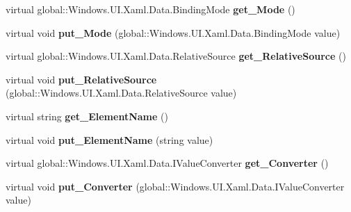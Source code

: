 \begin{DoxyCompactItemize}
virtual global\+::\+Windows.\+U\+I.\+Xaml.\+Data.\+Binding\+Mode {\bfseries get\+\_\+\+Mode} ()
\item 
\mbox{\label{class_windows_1_1_u_i_1_1_xaml_1_1_data_1_1_binding_abc7d75756c9f93a8ec488cecb97265c5}} 
virtual void {\bfseries put\+\_\+\+Mode} (global\+::\+Windows.\+U\+I.\+Xaml.\+Data.\+Binding\+Mode value)
\item 
\mbox{\label{class_windows_1_1_u_i_1_1_xaml_1_1_data_1_1_binding_ac23f4899bbf0de1eaba1d8fc24e9f7c3}} 
virtual global\+::\+Windows.\+U\+I.\+Xaml.\+Data.\+Relative\+Source {\bfseries get\+\_\+\+Relative\+Source} ()
\item 
\mbox{\label{class_windows_1_1_u_i_1_1_xaml_1_1_data_1_1_binding_a9e13fc7038d328684876c114c0262cd2}} 
virtual void {\bfseries put\+\_\+\+Relative\+Source} (global\+::\+Windows.\+U\+I.\+Xaml.\+Data.\+Relative\+Source value)
\item 
\mbox{\label{class_windows_1_1_u_i_1_1_xaml_1_1_data_1_1_binding_a93680aa9f018dd4f75ac7515c0a00ebf}} 
virtual string {\bfseries get\+\_\+\+Element\+Name} ()
\item 
\mbox{\label{class_windows_1_1_u_i_1_1_xaml_1_1_data_1_1_binding_aabd010dd96a55bf922196a78fe1ad2ed}} 
virtual void {\bfseries put\+\_\+\+Element\+Name} (string value)
\item 
\mbox{\label{class_windows_1_1_u_i_1_1_xaml_1_1_data_1_1_binding_a75056d5c72401518166caead820596d9}} 
virtual global\+::\+Windows.\+U\+I.\+Xaml.\+Data.\+I\+Value\+Converter {\bfseries get\+\_\+\+Converter} ()
\item 
\mbox{\label{class_windows_1_1_u_i_1_1_xaml_1_1_data_1_1_binding_a5721074cd9c3ec7e50bd6d5b645234e7}} 
virtual void {\bfseries put\+\_\+\+Converter} (global\+::\+Windows.\+U\+I.\+Xaml.\+Data.\+I\+Value\+Converter value)
\item 
\mbox{\label{class_windows_1_1_u_i_1_1_xaml_1_1_data_1_1_binding_a907080aef9cb5f5df15684599707b3ba}} 

\end{DoxyCompactItemize}
